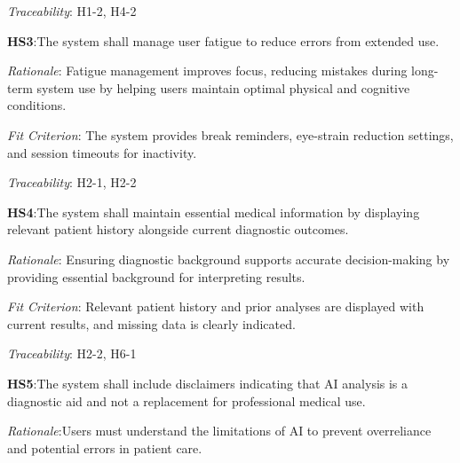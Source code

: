 \documentclass{article}
\begin{document}
\emph{Traceability}: H1-2, H4-2

\vspace{0.5cm}

\textbf{HS3}:\hypertarget{HS3}{The system shall manage user fatigue to reduce errors from extended use.}
\vspace{0.2cm}

\emph{Rationale}: Fatigue management improves focus, reducing mistakes during long-term system use by helping users maintain optimal physical and cognitive conditions.

\vspace{0.2cm}

\emph{Fit Criterion}: The system provides break reminders, eye-strain reduction settings, and session timeouts for inactivity.

\vspace{0.2cm}

\emph{Traceability}: H2-1, H2-2

\vspace{0.5cm}

\textbf{HS4}:\hypertarget{HS4}{The system shall maintain essential medical information by displaying relevant patient history alongside current diagnostic outcomes.}
\vspace{0.2cm}

\emph{Rationale}: Ensuring diagnostic background supports accurate decision-making by providing essential background for interpreting results.

\vspace{0.2cm}

\emph{Fit Criterion}: Relevant patient history and prior analyses are displayed with current results, and missing data is clearly indicated.

\vspace{0.2cm}

\emph{Traceability}: H2-2, H6-1

\vspace{0.5cm}

\textbf{HS5}:\hypertarget{HS5}{The system shall include disclaimers indicating that AI analysis is a diagnostic aid and not a replacement for professional medical use.}
\vspace{0.2cm}

\emph{Rationale}:Users must understand the limitations of AI to prevent overreliance and potential errors in patient care.

\vspace{0.2cm}
\end{document}
